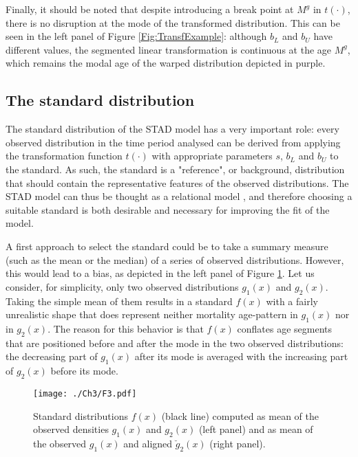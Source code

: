 \documentclass[Thesis]{subfiles}
\begin{document}
Finally, it should be noted that despite introducing a break point at $M^{g}$ in $t(\cdot)$, there is no disruption at the mode of the transformed distribution. This can be seen in the left panel of Figure \ref{Fig:TransfExample}: although $b_L$ and $b_U$ have different values, the segmented linear transformation is continuous at the age $M^{g}$, which remains the modal age of the warped distribution depicted in purple.    

\subsection{The standard distribution}
\label{Subsec:Ch3subsec2.2}

The standard distribution of the STAD model has a very important role: every observed distribution in the time period analysed can be derived from applying the transformation function $t(\cdot)$ with appropriate parameters $s$, $b_L$ and $b_U$ to the standard. As such, the standard is a "reference", or background, distribution that should contain the representative features of the observed distributions. The STAD model can thus be thought as a relational model \citep{brass1971scale}, and therefore choosing a suitable standard is both desirable and necessary for improving the fit of the model.  

A first approach to select the standard could be to take a summary
measure (such as the mean or the median) of a series of observed
distributions. However, this would lead to a bias, as depicted in the
left panel of Figure \ref{Fig:Standard}. Let us consider, for
simplicity, only two observed distributions $g_{1}(x)$ and $g_{2}(x)$. Taking
the simple mean of them results in a standard $f(x)$ with a fairly
unrealistic shape that does represent neither mortality age-pattern in
$g_{1}(x)$ nor in $g_{2}(x)$. The reason for this behavior is that $f(x)$
conflates age segments that are positioned before and after 
the mode in the two observed distributions: the decreasing part of
$g_1(x)$ after its mode is averaged with the increasing part of $g_2(x)$
before its mode. 

\begin{figure}[!ht]
	\begin{center}
		\texttt{[image: ./Ch3/F3.pdf]}   
		\caption{Standard distributions $f(x)$ (black line) computed as
			mean of the observed densities $g_{1}(x)$ and $g_{2}(x)$ (left panel) and
			as mean of the  observed $g_{1}(x)$ and aligned $\breve{g}_{2}(x)$ (right
			panel).\label{Fig:Standard}}    
	\end{center}
\end{figure}
\end{document}
